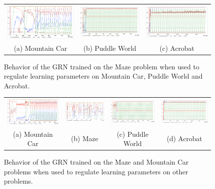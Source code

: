 \begin{figure}[t!]
\center
\begin{tabular}{ccc}
\includegraphics[width=0.32\linewidth]{MC_GRNMazeBehavior.pdf} &
\includegraphics[width=0.32\linewidth]{PW_GRNMazeBehavior.pdf} &
\includegraphics[width=0.32\linewidth]{ACP_GRNMazeBehavior.pdf} \\
(a) Mountain Car & (b) Puddle World & (c) Acrobat
\end{tabular}
\caption{Behavior of the GRN trained on the Maze problem when used to regulate learning parameters on Mountain Car, Puddle World and Acrobat.}\label{fig:all:GRNMazeBehavior}
\end{figure}

\begin{figure}[b!]
\center
\setlength{\tabcolsep}{0.5mm}
\begin{tabular}{cccc}
\includegraphics[width=0.25\linewidth]{MC_GRNGenericBehavior.pdf} &
\includegraphics[width=0.25\linewidth]{MZ_GRNGenericBehavior.pdf} &
\includegraphics[width=0.25\linewidth]{PW_GRNGenericBehavior.pdf} &
\includegraphics[width=0.25\linewidth]{ACP_GRNGenericBehavior.pdf} \\
(a) Mountain Car & (b) Maze & (c) Puddle World & (d) Acrobat
\end{tabular}
\caption{Behavior of the GRN trained on the Maze and Mountain Car problems when used to regulate learning parameters on other problems.}\label{fig:GRNGenericBehavior}
\end{figure}

